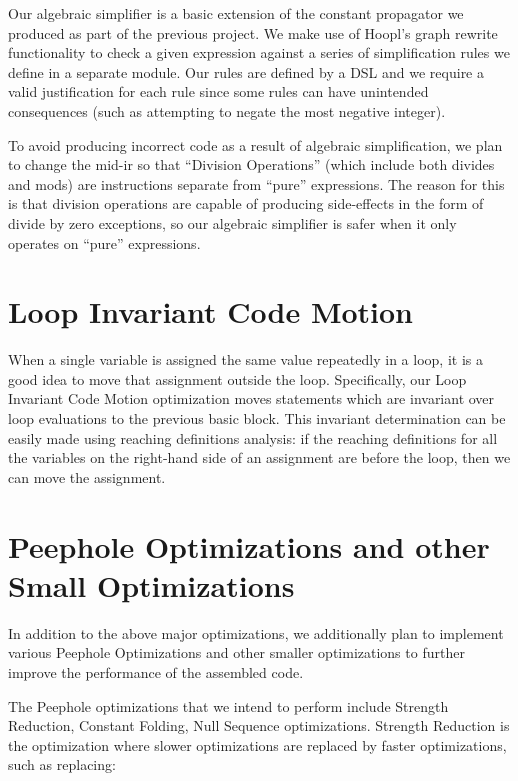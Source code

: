 \documentclass[11pt]{article}
\begin{document}
Our algebraic simplifier is a basic extension of the constant
propagator we produced as part of the previous project. We make use of
Hoopl's graph rewrite functionality to check a given expression
against a series of simplification rules we define in a separate
module. Our rules are defined by a DSL and we require a valid
justification for each rule since some rules can have unintended
consequences (such as attempting to negate the most negative
integer). 

To avoid producing incorrect code as a result of algebraic
simplification, we plan to change the mid-ir so that ``Division
Operations'' (which include both divides and mods) are instructions
separate from ``pure'' expressions. The reason for this is that
division operations are capable of producing side-effects in the form
of divide by zero exceptions, so our algebraic simplifier is safer
when it only operates on ``pure'' expressions. 



\section {Loop Invariant Code Motion}
\label{sec:codehoist}

When a single variable is assigned the same value repeatedly in a
loop, it is a good idea to move that assignment outside the loop.
Specifically, our Loop Invariant Code Motion optimization moves
statements which are invariant over loop evaluations to the previous
basic block. This invariant determination can be easily made using
reaching definitions analysis: if the reaching definitions for all the
variables on the right-hand side of an assignment are before the loop,
then we can move the assignment. 

\section {Peephole Optimizations and other Small Optimizations}
\label{sec:peephole}
In addition to the above major optimizations, we additionally plan to
implement various Peephole Optimizations and other smaller
optimizations to further improve the performance of the assembled
code.

The Peephole optimizations that we intend to perform include Strength
Reduction, Constant Folding, Null Sequence optimizations. Strength
Reduction is the optimization where slower optimizations are replaced
by faster optimizations, such as replacing:
\end{document}
